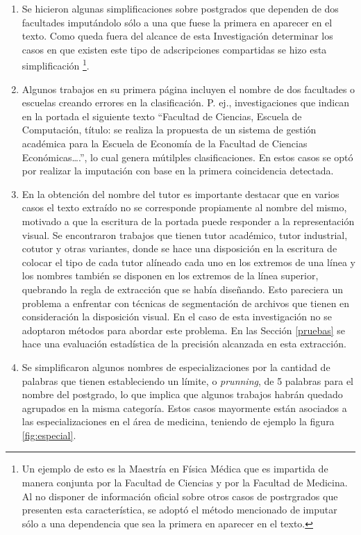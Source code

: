 \documentclass[
  12pt,
  openany]{book}
\begin{document}
\begin{enumerate}
\item
  Se hicieron algunas simplificaciones sobre postgrados que dependen de dos facultades imputándolo sólo a una que fuese la primera en aparecer en el texto. Como queda fuera del alcance de esta Investigación determinar los casos en que existen este tipo de adscripciones compartidas se hizo esta simplificación \footnote{Un ejemplo de esto es la Maestría en Física Médica que es impartida de manera conjunta por la Facultad de Ciencias y por la Facultad de Medicina. Al no disponer de información oficial sobre otros casos de postrgrados que presenten esta característica, se adoptó el método mencionado de imputar sólo a una dependencia que sea la primera en aparecer en el texto.}.
\item
  Algunos trabajos en su primera página incluyen el nombre de dos facultades o escuelas creando errores en la clasificación. P. ej., investigaciones que indican en la portada el siguiente texto ``Facultad de Ciencias, Escuela de Computación, título: se realiza la propuesta de un sistema de gestión académica para la Escuela de Economía de la Facultad de Ciencias Económicas\ldots.'', lo cual genera mútilples clasificaciones. En estos casos se optó por realizar la imputación con base en la primera coincidencia detectada.
\item
  En la obtención del nombre del tutor es importante destacar que en varios casos el texto extraído no se corresponde propiamente al nombre del mismo, motivado a que la escritura de la portada puede responder a la representación visual. Se encontraron trabajos que tienen tutor académico, tutor industrial, cotutor y otras variantes, donde se hace una disposición en la escritura de colocar el tipo de cada tutor alíneado cada uno en los extremos de una línea y los nombres también se disponen en los extremos de la línea superior, quebrando la regla de extracción que se había diseñando. Esto pareciera un problema a enfrentar con técnicas de segmentación de archivos que tienen en consideración la disposición visual. En el caso de esta investigación no se adoptaron métodos para abordar este problema. En las Sección \ref{pruebas} se hace una evaluación estadística de la precisión alcanzada en esta extracción.
\item
  Se simplificaron algunos nombres de especializaciones por la cantidad de palabras que tienen estableciendo un límite, o \emph{prunning}, de 5 palabras para el nombre del postgrado, lo que implica que algunos trabajos habrán quedado agrupados en la misma categoría. Estos casos mayormente están asociados a las especializaciones en el área de medicina, teniendo de ejemplo la figura \ref{fig:especial}.


\end{enumerate}
\end{document}
